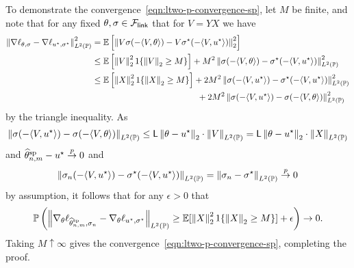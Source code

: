 To demonstrate the convergence~\eqref{eqn:ltwo-p-convergence-sp}, let $M$ be
finite, and note that for any fixed $\theta, \sigma \in \mathcal{F}_{\mathsf{link}}$ that for $V
= YX$ we have
\begin{align*}
	\left\|{\nabla \ell_{\theta, \sigma}
		- \nabla \ell_{u^\star, \sigma^\star}}\right\|_{L^2(\mathbb{P})}^2
	& = \mathbb{E} \left[{\left\|{V\sigma(-\langle V, \theta\rangle) -
			V\sigma^\star(-\langle V,  u^\star\rangle)}\right\|_2^2}\right] \\
	& \leq \mathbb{E} \left[{\left\|{V}\right\|_2^2 1\!\left\{{\left\|{V}\right\|_2 \geq M}\right\}}\right]
	+ M^2 \left\|{\sigma(-\langle V, \theta\rangle) - \sigma^\star(-\langle V, u^\star\rangle)}\right\|_{L^2(\mathbb{P})}^2 \\
	& \leq \mathbb{E} \left[{\left\|{X}\right\|_2^2 1\!\left\{{\left\|{X}\right\|_2 \geq M}\right\}}\right]
	+ 2M^2 \left\|{\sigma(-\langle V, u^\star\rangle) - \sigma^\star(-\langle V, u^\star\rangle)}\right\|_{L^2(\mathbb{P})}^2 \\
	& \qquad\qquad\qquad\qquad\qquad\qquad ~
	+ 2M^2 \left\|{\sigma(-\langle V, u^\star\rangle) - \sigma(-\langle V, \theta\rangle)}\right\|_{L^2(\mathbb{P})}^2
\end{align*}
by the triangle inequality.
As 
\begin{align*}
	\left\|{\sigma(-\langle V, u^\star\rangle) - \sigma(-\langle V, \theta\rangle)}\right\|_{L^2(\mathbb{P})}
	\leq \mathsf{L} \left\|{\theta - u^\star}\right\|_2 \cdot \left\|{V}\right\|_{L^2(\mathbb{P})}
	= \mathsf{L} \left\|{\theta - u^\star}\right\|_2 \cdot \left\|{X}\right\|_{L^2(\mathbb{P})}
\end{align*}
and $\widehat{\theta}^{\textup{sp}}_{n,m} - u^\star \stackrel{p}{\rightarrow} 0$ and
\begin{align*}
	\left\|{\sigma_n(-\langle V, u^\star\rangle) - \sigma^\star(-\langle V, u^\star\rangle)}\right\|_{L^2(\mathbb{P})}
	= \left\|{\sigma_n - \sigma^\star}\right\|_{L^2(\mathbb{P})} \stackrel{p}{\rightarrow} 0
\end{align*}
by assumption,
it follows that for any $\epsilon > 0$ that
\begin{align*}
	\mathbb{P}\left(\left\|{\nabla_{\theta} \ell_{\widehat{\theta}^{\textup{sp}}_{n,m}, \sigma_n}
		- \nabla_{\theta} \ell_{u^\star, \sigma^\star}}\right\|_{L^2(\mathbb{P})}
	\ge \mathbb{E}[\left\|{X}\right\|_2^2 1\!\left\{{\left\|{X}\right\|_2 \geq M}\right\}] + \epsilon
	\right) \to 0.
\end{align*}
Taking $M \uparrow \infty$ gives the
convergence~\eqref{eqn:ltwo-p-convergence-sp}, completing the proof.


%
%

